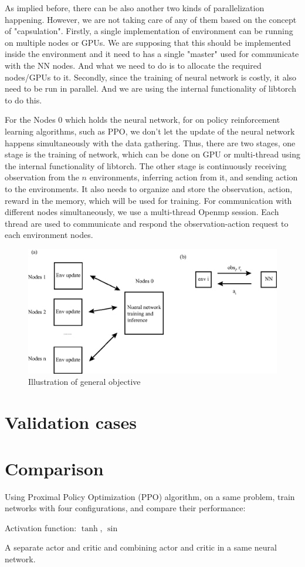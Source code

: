 \documentclass[12Pt]{article}
\begin{document}
As implied before, there can be also another two kinds of parallelization happening. However, we are not taking care of any of them based on the concept of "capsulation". 
Firstly, a single implementation of environment can be running on multiple nodes or GPUs. We are supposing that this should be implemented inside the environment and it need to has a single "master" used for communicate with the NN nodes. And what we need to do is to allocate the required nodes/GPUs to it. 
Secondly, since the training of neural network is costly, it also need to be run in parallel. And we are using the internal functionality of libtorch to do this. 

For the Nodes 0 which holds the neural network, for on policy reinforcement learning algorithms, such as PPO, we don't let the update of the neural network happens simultaneously with the data gathering. Thus, there are two stages, one stage is the training of network, which can be done on GPU or multi-thread using the internal functionality of libtorch. The other stage is continuously receiving observation from the $n$ environments, inferring action from it, and sending action to the environments. It also needs to organize and store the observation, action, reward in the memory, which will be used for training. For communication with different nodes simultaneously, we use a multi-thread Openmp session. Each thread are used to communicate and respond the observation-action request to each environment nodes. 


\begin{figure}[htp]
    \centering
    \includegraphics[]{./figures/schematics.eps}
    \caption{Illustration of general objective}
    \label{fig:comm}
\end{figure}


\section{Validation cases}\label{sec:case}

\section{Comparison}\label{sec:comp}
Using Proximal Policy Optimization (PPO) algorithm, on a same problem, train networks with four configurations, and compare their performance:

Activation function: $\tanh$, $\sin$

A separate actor and critic and combining actor and critic in a same neural network. 



 
\end{document}

